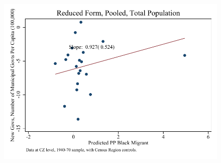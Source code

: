 \documentclass{article}
\begin{document}
\begin{figure}
\centering
\includegraphics{figures/simplefigs/pooled_gen_muni_pc_C3_total_rf.pdf}
\end{figure}
\clearpage
\end{document}
